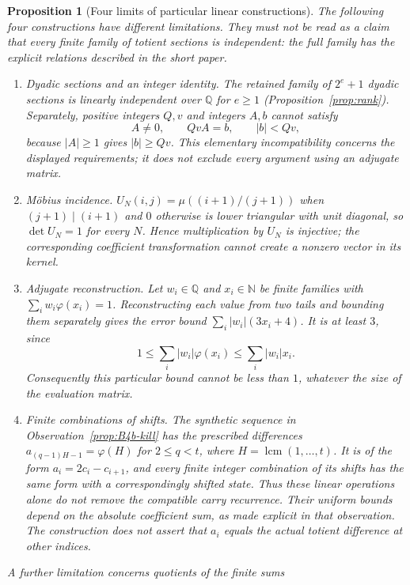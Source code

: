 \documentclass[11pt]{article}
\theoremstyle{plain}
\newtheorem{prop}[thm]{Proposition}
\theoremstyle{definition}
\theoremstyle{remark}
\newcommand{\N}{\mathbb{N}}
\newcommand{\Q}{\mathbb{Q}}
\begin{document}
\begin{prop}[Four limits of particular linear constructions]
\label{prop:b6}
The following four constructions have different limitations. They must
not be read as a claim that every finite family of totient sections is
independent: the full family has the explicit relations described in the
short paper.
\begin{enumerate}[label=(\roman*),leftmargin=*]
\item \emph{Dyadic sections and an integer identity.} The retained
  family of $2^e+1$ dyadic sections is linearly independent over $\Q$
  for $e\ge1$ (Proposition~\ref{prop:rank}). Separately, positive integers
  $Q,v$ and integers $A,b$ cannot satisfy
  \[
     A\ne0,\qquad QvA=b,\qquad |b|<Qv,
  \]
  because $|A|\ge1$ gives $|b|\ge Qv$.
  This elementary incompatibility concerns the displayed requirements;
  it does not exclude every argument using an adjugate matrix.
\item \emph{M\"obius incidence.} $U_N(i,j) = \mu((i{+}1)/(j{+}1))$ when
  $(j{+}1) \mid (i{+}1)$ and $0$ otherwise is lower triangular with unit
  diagonal, so $\det U_N = 1$ for every $N$. Hence multiplication by
  $U_N$ is injective; the corresponding coefficient transformation cannot
  create a nonzero vector in its kernel.
\item \emph{Adjugate reconstruction.} Let $w_i\in\Q$ and
  $x_i\in\N$ be finite families with $\sum_i w_i\varphi(x_i)=1$.
  Reconstructing each value from two tails and bounding them separately
  gives the error bound $\sum_i|w_i|(3x_i+4)$. It is at least $3$, since
  \[
   1\le\sum_i|w_i|\varphi(x_i)\le\sum_i|w_i|x_i.
  \]
  Consequently this particular bound cannot be less than $1$, whatever
  the size of the evaluation matrix.
\item \emph{Finite combinations of shifts.} The synthetic sequence in
  Observation~\ref{prop:B4b-kill} has the prescribed differences
  $a_{(q-1)H-1}=\varphi(H)$ for $2\le q<t$, where
  $H=\operatorname{lcm}(1,\ldots,t)$. It is of the form
  $a_i=2c_i-c_{i+1}$, and every finite integer combination of its shifts
  has the same form with a correspondingly shifted state. Thus these
  linear operations alone do not remove the compatible carry recurrence.
  Their uniform bounds depend on the absolute coefficient sum, as made
  explicit in that observation. The construction does not assert that
  $a_i$ equals the actual totient difference at other indices.
\end{enumerate}
A further limitation concerns quotients of the finite sums

\end{prop}
\end{document}
